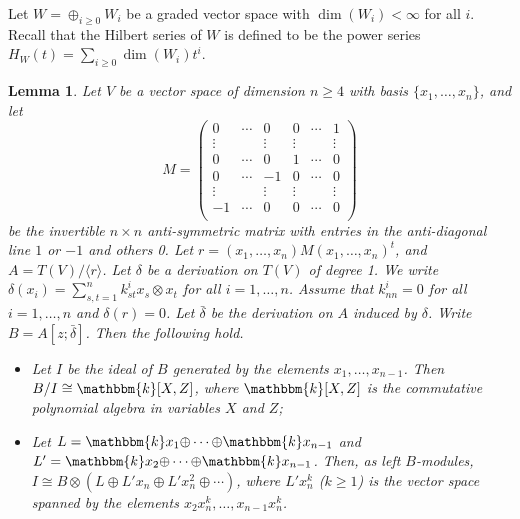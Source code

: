 \documentclass[a4paper]{amsart}
\newtheorem{lem}[thm]{Lemma}
\begin{document}
Let $W={\oplus}_{i\ge0}W_i$ be a graded vector space with $\dim (W_i)<\infty$ for all $i$. Recall that the Hilbert series of $W$ is defined to be the power series $H_W(t)=\sum_{i\ge0}\dim(W_i) t^i$.

\begin{lem}\label{lem2} Let $V$ be a vector space of dimension $n\ge4$ with basis $\{x_1,\dots,x_n\}$, and let \begin{equation}\label{eq4} M=\left(
\begin{array}{cccccc}
                                                                                                          0 & \cdots & 0 & 0 & \cdots & 1 \\
                                                                                                        \vdots &   & \vdots & \vdots &  & \vdots \\
                                                                                                          0  & \cdots  & 0  & 1 & \cdots & 0  \\
                                                                                                          0  & \cdots  & -1 & 0 & \cdots  & 0  \\
                                                                                                     \vdots  &   & \vdots  & \vdots &   & \vdots  \\
                                                                                                          -1 & \cdots  & 0  &0  & \cdots  & 0  \\
                                                                                                        \end{array}
                                                                                                      \right)\end{equation}
be the invertible $n\times n$ anti-symmetric matrix with entries in the anti-diagonal line $1$ or $-1$ and others 0.
Let $r=(x_1,\dots,x_n)M(x_1,\dots,x_n)^t$, and $A=T(V)/\langle r\rangle$. Let $\delta$ be a derivation on $T(V)$ of degree 1. We write $\delta(x_i)=\sum_{s,t=1}^nk^i_{st}x_s{\otimes} x_t$ for all $i=1,\dots,n$. Assume that $k^i_{nn}=0$ for all $i=1,\dots,n$ and $\delta(r)=0$. Let $\bar{\delta}$ be the derivation on $A$ induced by $\delta$. Write $B=A[z;\bar{\delta}]$.
Then the following hold.
\begin{itemize}
  \item [(i)] Let $I$ be the ideal of $B$ generated by the elements $x_1,\dots,x_{n-1}$. Then $B/I\cong {\mathbbm{k}}[X,Z]$, where ${\mathbbm{k}}[X,Z]$ is the commutative polynomial algebra in variables $X$ and $Z$;
  \item [(ii)] Let $L={\mathbbm{k}} x_1{\oplus}\cdots{\oplus}{\mathbbm{k}} x_{n-1}$ and $L'={\mathbbm{k}} x_2{\oplus}\cdots{\oplus}{\mathbbm{k}} x_{n-1}$. Then, as left $B$-modules, $I\cong B{\otimes}(L{\oplus} L'x_n{\oplus} L'x_n^2{\oplus}\cdots)$, where $L'x_n^k$ ($k\ge1$) is the vector space spanned by the elements $x_2x_n^k,\dots,x_{n-1}x_n^k$.
\end{itemize}
\end{lem}
\end{document}
